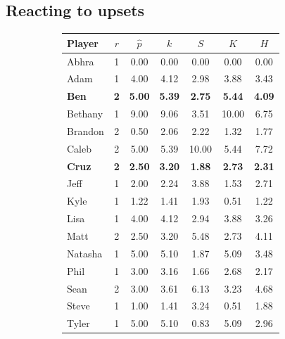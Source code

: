 \documentclass[letterpaper, 10 pt, conference]{ieeeconf}  %
\begin{document}
\subsection{Reacting to upsets}
\begin{figure}[h!b]
        \centering
        \begin{subfigure}[hb]{0.4\textwidth}
                \footnotesize
                \centering
                \begin{tabular}{lccc|ccc}
                        \toprule
                        Player  & $r$   & $\hat{p}$ & $k$ & $S$ & $K$ & $H$ \\
                        \midrule
                        Abhra	& 1	& 0.00	& 0.00 & 0.00 & 0.00 & 0.00 \\
                        Adam	& 1	& 4.00	& 4.12 & 2.98 & 3.88 & 3.43 \\
                        \textbf{Ben}	& \textbf{2}	& \textbf{5.00}	& \textbf{5.39} & \textbf{2.75} & \textbf{5.44} & \textbf{4.09} \\
                        Bethany	& 1	& 9.00	& 9.06 & 3.51 & 10.00 & 6.75 \\
                        Brandon	& 2	& 0.50	& 2.06 & 2.22 & 1.32 & 1.77 \\
                        Caleb	& 2	& 5.00	& 5.39 & 10.00 & 5.44 & 7.72 \\
                        \textbf{Cruz}	& \textbf{2}	& \textbf{2.50}	& \textbf{3.20} & \textbf{1.88} & \textbf{2.73} & \textbf{2.31} \\
                        Jeff	& 1	& 2.00  & 2.24 & 3.88 & 1.53 & 2.71 \\
                        Kyle	& 1	& 1.22	& 1.41 & 1.93 & 0.51 & 1.22 \\
                        Lisa	& 1	& 4.00  & 4.12 & 2.94 & 3.88 & 3.26 \\
                        Matt	& 2	& 2.50  & 3.20 & 5.48 & 2.73 & 4.11 \\
                        Natasha	& 1	& 5.00  & 5.10 & 1.87 & 5.09 & 3.48 \\
                        Phil	& 1	& 3.00	& 3.16 & 1.66 & 2.68 & 2.17 \\
                        Sean	& 2	& 3.00	& 3.61 & 6.13 & 3.23 & 4.68 \\
                        Steve	& 1	& 1.00 	& 1.41 & 3.24 & 0.51 & 1.88 \\
                        Tyler	& 1	& 5.00  & 5.10 & 0.83 & 5.09 & 2.96 \\

\end{tabular}
\end{subfigure}
\end{figure}
\end{document}
